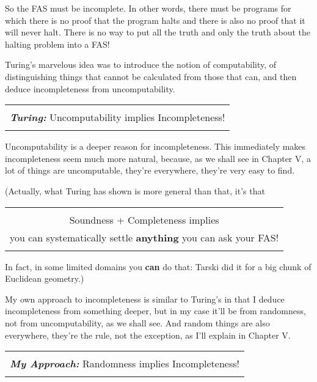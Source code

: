 \documentclass[12pt]{book}
\begin{document}
So the FAS must be incomplete. In other words, there must be programs for which there is
no proof that the program halts and there is also no proof that it will never halt.
There is no way to put all the truth and only the truth about the halting problem into a FAS!

Turing's marvelous idea was to introduce the notion of computability, of distinguishing things
that cannot be calculated from those that can, and then deduce incompleteness from
uncomputability.

\begin{center}
\begin{tabular}{|c|}
\hline
\\
\textbf{\emph{\large Turing:}} Uncomputability implies Incompleteness!
\\
\\
\hline
\end{tabular}
\end{center}

Uncomputability is a deeper reason for incompleteness. This immediately makes incompleteness
seem much more natural, because, as we shall see in Chapter V, a lot of things are uncomputable,
they're everywhere, they're very easy to find. 

(Actually, what Turing has shown is more general than that, it's that
\begin{center}
\begin{tabular}{|c|}
\hline
\\
Soundness + Completeness implies 
\\
you can systematically settle \textbf{anything} you can ask your FAS!
\\
\\
\hline
\end{tabular}
\end{center}
In fact, in some limited domains you \textbf{can} do that: Tarski did it for a big chunk of
Euclidean geometry.)

My own approach to incompleteness is similar to Turing's in that I deduce incompleteness from
something deeper, but in my case it'll be from randomness, not from uncomputability, as we shall see.
And random things are also everywhere, they're the rule, not the exception, as I'll explain
in Chapter V.

\begin{center}
\begin{tabular}{|c|}
\hline
\\
\textbf{\emph{\large My Approach:}} Randomness implies Incompleteness!
\\
\\
\hline
\end{tabular}
\end{center}
\end{document}
